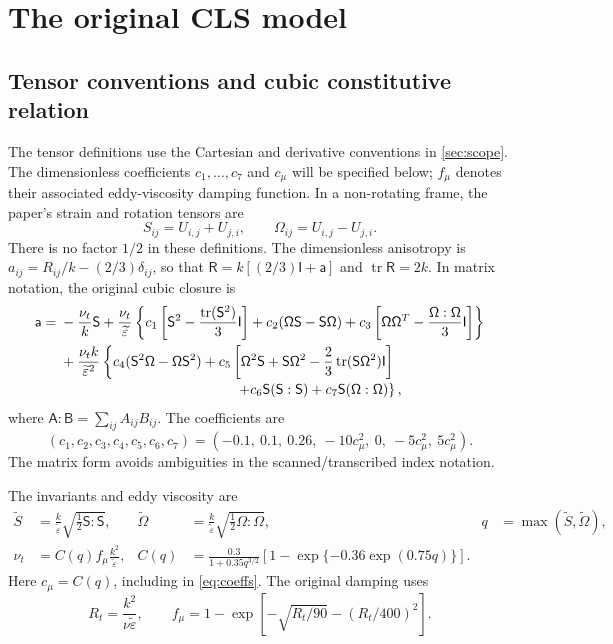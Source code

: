 \documentclass[11pt,a4paper]{article}
\numberwithin{equation}{section}
\newcommand{\et}{\widetilde{\varepsilon}}
\newcommand{\nut}{\nu_t}
\newcommand{\tr}{\operatorname{tr}}
\newcommand{\R}{\mathsf{R}}
\newcommand{\I}{\mathsf{I}}
\newcommand{\Sm}{\mathsf{S}}
\newcommand{\Om}{\mathsf{\Omega}}
\newcommand{\am}{\mathsf{a}}
\begin{document}
\section{The original CLS model}
\label{sec:cls}
\subsection{Tensor conventions and cubic constitutive relation}
The tensor definitions use the Cartesian and derivative conventions in
\cref{sec:scope}. The dimensionless coefficients $c_1,\ldots,c_7$ and
$c_\mu$ will be specified below; $f_\mu$ denotes their associated
eddy-viscosity damping function. In a non-rotating frame, the paper's
strain and rotation tensors are
\begin{equation}
 S_{ij}=U_{i,j}+U_{j,i},\qquad
 \Omega_{ij}=U_{i,j}-U_{j,i}.
 \label{eq:SO}
\end{equation}
There is no factor $1/2$ in these definitions. The dimensionless anisotropy
is $a_{ij}=R_{ij}/k-(2/3)\delta_{ij}$, so that
$\R=k[(2/3)\I+\am]$ and $\tr\R=2k$. In matrix notation, the original cubic
closure \cite{CLS1996} is
\begin{align}
\am={}&-\frac{\nut}{k}\Sm
 +\frac{\nut}{\et}\left\{
 c_1\left[\Sm^2-\frac{\tr(\Sm^2)}3\I\right]
 +c_2(\Om\Sm-\Sm\Om)
 +c_3\left[\Om\Om^{T}-\frac{\Om:\Om}{3}\I\right]\right\}
\nonumber\\
&+\frac{\nut k}{\et^2}\left\{
 c_4(\Sm^2\Om-\Om\Sm^2)
 +c_5\left[\Om^2\Sm+\Sm\Om^2
   -\frac23\tr(\Sm\Om^2)\I\right]\right.
\nonumber\\[-2pt]
&\hspace{44mm}\left.
 +c_6\Sm(\Sm:\Sm)+c_7\Sm(\Om:\Om)
 \right\},
\label{eq:cubic}
\end{align}
where $\mathsf A:\mathsf B=\sum_{ij}A_{ij}B_{ij}$. The coefficients are
\begin{equation}
(c_1,c_2,c_3,c_4,c_5,c_6,c_7)
=(-0.1,\ 0.1,\ 0.26,\ -10c_\mu^2,\ 0,\ -5c_\mu^2,\ 5c_\mu^2).
\label{eq:coeffs}
\end{equation}
The matrix form avoids ambiguities in the scanned/transcribed index notation.

The invariants and eddy viscosity are
\begin{align}
\widetilde S&=\frac{k}{\et}\sqrt{\tfrac12\Sm:\Sm},
&
\widetilde\Omega&=\frac{k}{\et}\sqrt{\tfrac12\Om:\Om},
&
q&=\max(\widetilde S,\widetilde\Omega),
\label{eq:invariants}\\
\nut&=C(q)f_\mu\frac{k^2}{\et},
&
C(q)&=\frac{0.3}{1+0.35q^{3/2}}
\left[1-\exp\{-0.36\exp(0.75q)\}\right].
\label{eq:C}
\end{align}
Here $c_\mu=C(q)$, including in \cref{eq:coeffs}.
The original damping uses
\begin{equation}
 R_t=\frac{k^2}{\nu\et},\qquad
 f_\mu=1-\exp\!\left[-\sqrt{R_t/90}-(R_t/400)^2\right].
 \label{eq:damping}
\end{equation}
\end{document}
